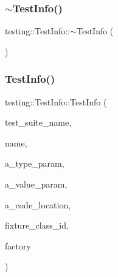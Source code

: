 \mbox{\label{classtesting_1_1_test_info_a8d382c1b1b511f0d9112c14684809852}} 
\subsubsection{\texorpdfstring{$\sim$TestInfo()}{~TestInfo()}\hspace{0.1cm}{\footnotesize\ttfamily [2/3]}}
{\footnotesize\ttfamily testing\+::\+Test\+Info\+::$\sim$\+Test\+Info (\begin{DoxyParamCaption}{ }\end{DoxyParamCaption})}

\mbox{\label{classtesting_1_1_test_info_aa652b2ec74957083637ece79297b274b}} 
\subsubsection{\texorpdfstring{TestInfo()}{TestInfo()}\hspace{0.1cm}{\footnotesize\ttfamily [2/3]}}
{\footnotesize\ttfamily testing\+::\+Test\+Info\+::\+Test\+Info (\begin{DoxyParamCaption}\item[{const std\+::string \&}]{test\+\_\+suite\+\_\+name,  }\item[{const std\+::string \&}]{name,  }\item[{const char $\ast$}]{a\+\_\+type\+\_\+param,  }\item[{const char $\ast$}]{a\+\_\+value\+\_\+param,  }\item[{\mbox{\hyperlink{structtesting_1_1internal_1_1_code_location}{internal\+::\+Code\+Location}}}]{a\+\_\+code\+\_\+location,  }\item[{\mbox{\hyperlink{namespacetesting_1_1internal_a38c435cbab5f8b784e2e7f3356cab242}{internal\+::\+Type\+Id}}}]{fixture\+\_\+class\+\_\+id,  }\item[{\mbox{\hyperlink{classtesting_1_1internal_1_1_test_factory_base}{internal\+::\+Test\+Factory\+Base}} $\ast$}]{factory }\end{DoxyParamCaption})\hspace{0.3cm}{\ttfamily [private]}}

